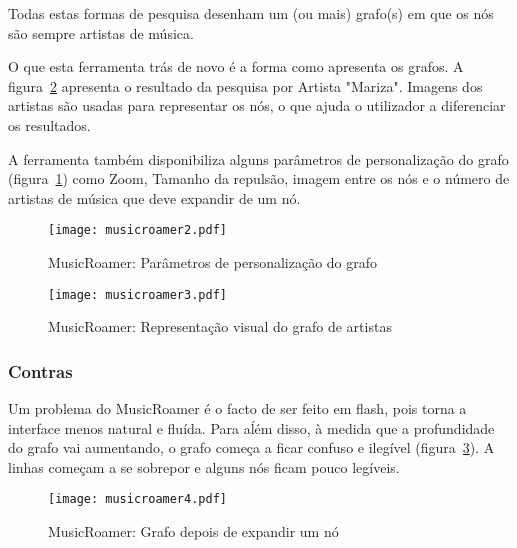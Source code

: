   Todas estas formas de pesquisa desenham um (ou mais) grafo(s) em que os nós são sempre artistas de música.

  O que esta ferramenta trás de novo é a forma como apresenta os grafos.
  A figura~\ref{fig:sota_musicroamer3} apresenta o resultado da pesquisa por Artista "Mariza".
  Imagens dos artistas são usadas para representar os nós, o que ajuda o utilizador a diferenciar os resultados.

  A ferramenta também disponibiliza alguns parâmetros de personalização do grafo (figura~\ref{fig:sota_musicroamer2}) como Zoom, Tamanho da repulsão, imagem entre os nós e o número de artistas de música que deve expandir de um nó.

  \begin{figure}[tb]
    \begin{center}
      \texttt{[image: musicroamer2.pdf]}
    \end{center}
    \caption{MusicRoamer: Parâmetros de personalização do grafo}
    \label{fig:sota_musicroamer2}
  \end{figure}



  \begin{figure}[tb]
    \begin{center}
      \texttt{[image: musicroamer3.pdf]}
    \end{center}
    \caption{MusicRoamer: Representação visual do grafo de artistas}
    \label{fig:sota_musicroamer3}
  \end{figure}


  \subsubsection{Contras} %
  \label{ssub:contras}

  Um problema do MusicRoamer é o facto de ser feito em flash, pois torna a interface menos natural e fluída.
  Para aĺém disso, à medida que a profundidade do grafo vai aumentando, o grafo começa a ficar confuso e ilegível (figura~\ref{fig:sota_musicroamer4}).
  A linhas começam a se sobrepor e alguns nós ficam pouco legíveis.

  \begin{figure}[tb]
    \begin{center}
      \texttt{[image: musicroamer4.pdf]}
    \end{center}
    \caption{MusicRoamer: Grafo depois de expandir um nó}
    \label{fig:sota_musicroamer4}
  \end{figure}

